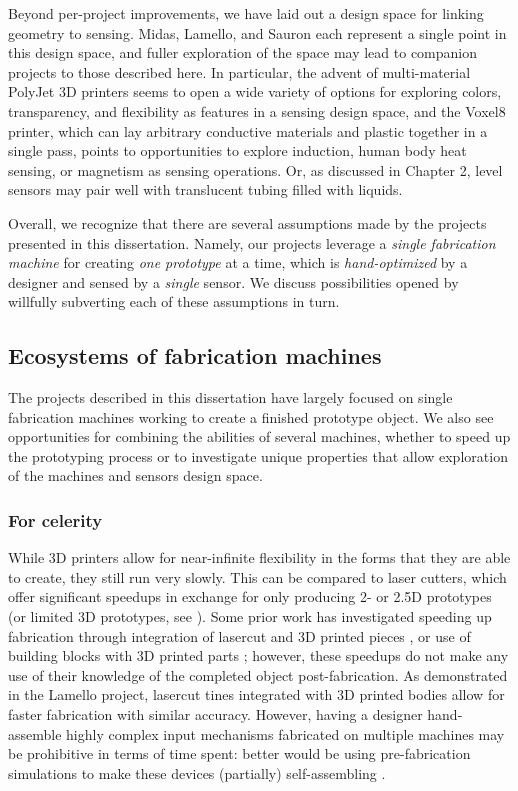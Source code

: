 Beyond per-project improvements, we have laid out a design space for linking geometry to sensing. Midas, Lamello, and Sauron each represent a single point in this design space, and fuller exploration of the space may lead to companion projects to those described here. In particular, the advent of multi-material PolyJet 3D printers seems to open a wide variety of options for exploring colors, transparency, and flexibility as features in a sensing design space, and the Voxel8 \cite{voxel8} printer, which can lay arbitrary conductive materials and plastic together in a single pass, points to opportunities to explore induction, human body heat sensing, or magnetism as sensing operations. Or, as discussed in Chapter 2, level sensors may pair well with translucent tubing filled with liquids.

Overall, we recognize that there are several assumptions made by the projects presented in this dissertation. Namely, our projects leverage a \emph{single fabrication machine} for creating \emph{one prototype} at a time, which is \emph{hand-optimized} by a designer and sensed by a \emph{single} sensor. We discuss possibilities opened by willfully subverting each of these assumptions in turn.

\subsection{Ecosystems of fabrication machines}

The projects described in this dissertation have largely focused on single fabrication machines working to create a finished prototype object. We also see opportunities for combining the abilities of several machines, whether to speed up the prototyping process or to investigate unique properties that allow exploration of the machines and sensors design space.

    \subsubsection{For celerity}

    While 3D printers allow for near-infinite flexibility in the forms that they are able to create, they still run very slowly. This can be compared to laser cutters, which offer significant speedups in exchange for only producing 2- or 2.5D prototypes (or limited 3D prototypes, see \cite{mueller-laserorigami}). Some prior work has investigated speeding up fabrication through integration of lasercut and 3D printed pieces \cite{beyer-platener}, or use of building blocks with 3D printed parts \cite{mueller-fabrickation}; however, these speedups do not make any use of their knowledge of the completed object post-fabrication. As demonstrated in the Lamello project, lasercut tines integrated with 3D printed bodies allow for faster fabrication with similar accuracy. However, having a designer hand-assemble highly complex input mechanisms fabricated on multiple machines may be prohibitive in terms of time spent: better would be using pre-fabrication simulations to make these devices (partially) self-assembling \cite{tibbits-self-assembly}.

